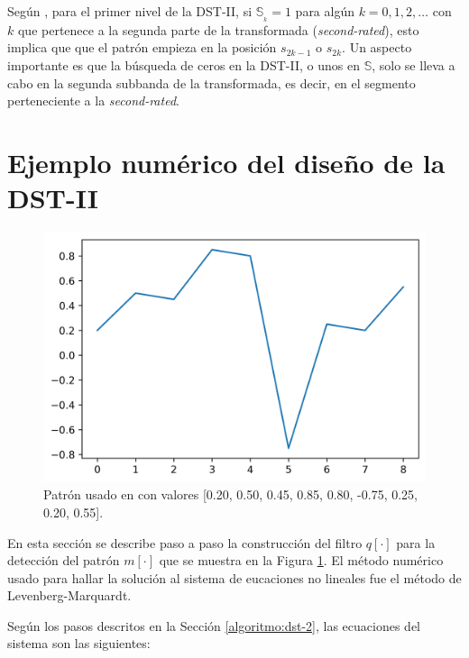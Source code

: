 Según \cite{Guido2018}, para el primer nivel de la DST-II, si $\mathbb{S}_{_k}=1$ para algún $k=0,1,2,\ldots$
con $k$ que pertenece a la segunda parte de la transformada (\textit{second-rated}), esto implica que 
que el patrón empieza en la posición $s_{2k-1}$ o $s_{2k}$. Un aspecto importante es que la búsqueda de 
ceros en la DST-II, o unos en $\mathbb{S}$, solo se lleva a cabo en la segunda subbanda de la transformada,
es decir, en el segmento perteneciente a la \textit{second-rated}.

\section{Ejemplo numérico del diseño de la DST-II}

\begin{figure} 
	\centering
	\includegraphics[scale=0.5]{Graphics/guido20118-pattern.png}
	\caption{Patrón usado en \cite{Guido2018} con valores [0.20, 0.50, 0.45, 0.85, 0.80, -0.75, 0.25, 0.20, 0.55].} \label{fig:Guido2018-pattern}
\end{figure}

En esta sección se describe paso a paso la construcción del filtro $q[\cdot]$ para la detección del
patrón $m[\cdot]$ que se muestra en la Figura \ref{fig:Guido2018-pattern}. El método numérico usado para hallar
la solución al sistema de eucaciones no lineales fue el método de Levenberg-Marquardt.

Según los pasos descritos en la Sección \ref{algoritmo:dst-2}, las ecuaciones del sistema son las siguientes:

